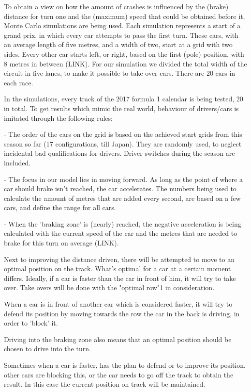 To obtain a view on how the amount of crashes is influenced by the (brake) distance for turn one and the (maximum) speed that could be obtained before it, Monte Carlo simulations are being used. Each simulation represents a start of a grand prix, in which every car attempts to pass the first turn. These cars, with an average length of five metres, and a width of two, start at a grid with two sides. Every other car starts left, or right, based on the first (pole) position, with 8 metres in between (LINK). For our simulation we divided the total width of the circuit in five lanes, to make it possible to take over cars. There are 20 cars in each race.

In the simulations, every track of the 2017 formula 1 calendar is being tested, 20 in total. To get results which mimic the real world, behaviour of drivers/cars is imitated through the following rules;

- The order of the cars on the grid is based on the achieved start grids from this season so far (17 configurations, till Japan). They are randomly used, to neglect incidental bad qualifications for drivers. Driver switches during the season are included.

- The focus in our model lies in moving forward. As long as the point of where a car should brake isn't reached, the car accelerates. The numbers being used to calculate the amount of metres that are added every second, are based on a few cars, and define the range for all cars.

- When the 'braking zone' is (nearly) reached, the negative acceleration is being calculated with the current speed of the car and the metres that are needed to brake for this turn on average (LINK).

Next to improving the distance driven, there will be attempted to move to an optimal position on the track. What's optimal for a car at a certain moment differs. Ideally, if a car is faster than the car in front of him, it will try to take over. Take overs will be done with the "optimal row"1 in consideration.

When a car is in front of another car which is considered faster, it will try to defend its position by moving towards the row the car in the back is driving, in order to 'block' it.

Driving into the braking zone also means that an optimal position should be chosen to drive into the turn.

Sometimes when a car is faster, has the plan to defend or to improve its position, other cars are blocking this, or the car needs to go off the track to obtain the result. In this case the current position on track will be maintained.

